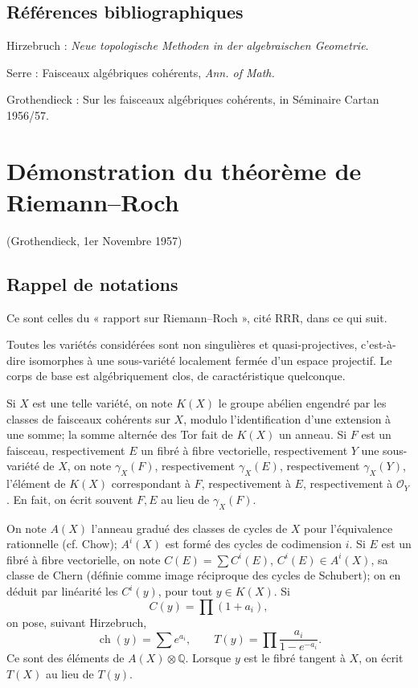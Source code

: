 \documentclass[11pt]{article}
\newcommand{\ch}{\operatorname{ch}}
\newcommand{\RRR}{\mathrm{RRR}}
\providecommand{\ch}{\operatorname{ch}}
\begin{document}
\subsection*{Références bibliographiques}
\begin{enumerate}[label={[\arabic*]}]
\item Hirzebruch : \emph{Neue topologische Methoden in der algebraischen Geometrie}.
\item Serre : Faisceaux algébriques cohérents, \emph{Ann. of Math.}
\item Grothendieck : Sur les faisceaux algébriques cohérents, in Séminaire Cartan 1956/57.
\end{enumerate}

\section*{Démonstration du théorème de Riemann--Roch}
\begin{center}
(Grothendieck, 1er Novembre 1957)
\end{center}

\subsection*{Rappel de notations}
Ce sont celles du « rapport sur Riemann--Roch », cité \(\RRR\), dans ce qui suit.

Toutes les variétés considérées sont non singulières et quasi-projectives, c'est-à-dire isomorphes à une sous-variété localement fermée d'un espace projectif. Le corps de base est algébriquement clos, de caractéristique quelconque.

Si \(X\) est une telle variété, on note \(K(X)\) le groupe abélien engendré par les classes de faisceaux cohérents sur \(X\), modulo l'identification d'une extension à une somme; la somme alternée des Tor fait de \(K(X)\) un anneau. Si \(F\) est un faisceau, respectivement \(E\) un fibré à fibre vectorielle, respectivement \(Y\) une sous-variété de \(X\), on note \(\gamma_X(F)\), respectivement \(\gamma_X(E)\), respectivement \(\gamma_X(Y)\), l'élément de \(K(X)\) correspondant à \(F\), respectivement à \(E\), respectivement à \(\mathcal O_Y\). En fait, on écrit souvent \(F,E\) au lieu de \(\gamma_X(F)\).

On note \(A(X)\) l'anneau gradué des classes de cycles de \(X\) pour l'équivalence rationnelle (cf. Chow); \(A^i(X)\) est formé des cycles de codimension \(i\). Si \(E\) est un fibré à fibre vectorielle, on note \(C(E)=\sum C^i(E)\), \(C^i(E)\in A^i(X)\), sa classe de Chern (définie comme image réciproque des cycles de Schubert); on en déduit par linéarité les \(C^i(y)\), pour tout \(y\in K(X)\). Si
\[
  C(y)=\prod(1+a_i),
\]
on pose, suivant Hirzebruch,
\[
  \ch(y)=\sum e^{a_i},\qquad
  T(y)=\prod\frac{a_i}{1-e^{-a_i}}.
\]
Ce sont des éléments de \(A(X)\otimes\mathbb Q\). Lorsque \(y\) est le fibré tangent à \(X\), on écrit \(T(X)\) au lieu de \(T(y)\).
\end{document}
